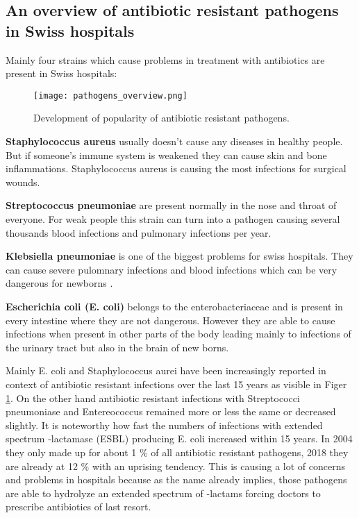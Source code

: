 \subsection{An overview of antibiotic resistant pathogens in Swiss hospitals}
Mainly four strains which cause problems in treatment with antibiotics are present in Swiss hospitals:\\
\begin{figure}[H]
	\texttt{[image: pathogens\_overview.png]}
	\caption{Development of popularity of antibiotic resistant pathogens.
	\cite{swiss_hospitals_pathogens}}
	\label{figure:pathogen_dvelopment}
\end{figure}
\textbf{Staphylococcus aureus} usually doesn't cause any diseases in healthy people. But if someone's immune system is weakened they can cause skin and bone inflammations. Staphylococcus aureus is causing the most infections for surgical wounds.

\textbf{Streptococcus pneumoniae} are present normally in the nose and throat of everyone. For weak people this strain can turn into a pathogen causing several thousands blood infections and pulmonary infections per year. 

\textbf{Klebsiella pneumoniae} is one of the biggest problems for swiss hospitals. They can cause severe pulomnary infections and blood infections which can be very dangerous for newborns \cite{swiss_hospitals_pathogens}.

\textbf{Escherichia coli (E. coli)} belongs to the enterobacteriaceae and is present in every intestine where they are not dangerous. However they are able to cause infections when present in other parts of the body leading mainly to infections of the urinary tract but also in the brain of new borns. 

Mainly E. coli and Staphylococcus aurei have been increasingly reported in context of antibiotic resistant infections over the last 15 years as visible in Figer \ref{figure:pathogen_dvelopment}. On the other hand antibiotic resistant infections with Streptococci pneumoniase and Entereococcus remained more or less the same or decreased slightly.
It is noteworthy how fast the numbers of infections with extended spectrum \textbeta-lactamase (ESBL) producing E. coli increased within 15 years. In 2004 they only made up for about 1 \% of all antibiotic resistant pathogens, 2018 they are already at 12 \% with an uprising tendency. This is causing a lot of concerns and problems in hospitals because as the name already implies, those pathogens are able to hydrolyze an extended spectrum of \textbeta-lactams forcing doctors to prescribe antibiotics of last resort.

